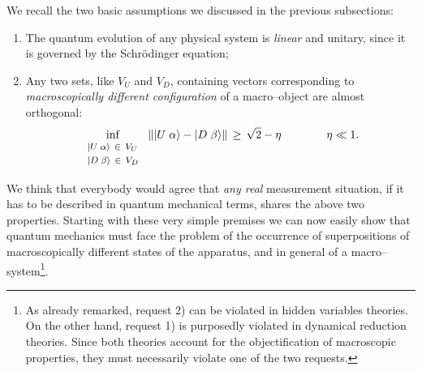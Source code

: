 \documentclass[10pt,a4paper]{article}
\begin{document}
We recall the two basic assumptions we discussed in the previous
subsections:
\begin{enumerate}
\item The quantum evolution of any physical system is {\it linear}
and unitary, since it is governed by the Schr\"odinger equation;
\item Any two sets, like $V_{U}$ and $V_{D}$, containing vectors
corresponding to {\it macroscopically different configuration} of
a macro--object are almost orthogonal:
\begin{equation} \label{req4}
\inf_{\begin{array}{l}
\makebox{\footnotesize $|U\;\alpha\rangle \,\in\, V_{U}$} \\
\makebox{\footnotesize $|D\;\beta\rangle \,\in\, V_{D}$}
\end{array}}\, \| |U\;\alpha\rangle -
|D\;\beta\rangle \|\, \geq\, \sqrt{2} - \eta \qquad\qquad \eta \ll
1.
\end{equation}
\end{enumerate}
We think that everybody would agree that {\it any real}
measurement situation, if it has to be described in  quantum
mechanical terms, shares the above two properties. Starting with
these very simple premises we can now easily  show that quantum
mechanics must face the problem of the occurrence of
superpositions of macroscopically different states of the
apparatus, and in general of a macro--system\footnote{As already
remarked, request 2) can be violated in hidden variables theories.
On the other hand, request 1) is purposedly violated in dynamical
reduction theories. Since both theories account for the
objectification of macroscopic properties, they must necessarily
violate one of the two requests.}.
\end{document}
